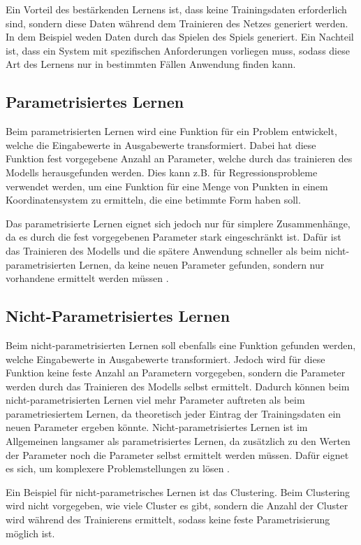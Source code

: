 Ein Vorteil des bestärkenden Lernens ist, dass keine Trainingsdaten erforderlich sind, sondern diese Daten während dem Trainieren des Netzes generiert werden. In dem Beispiel weden Daten durch das Spielen des Spiels generiert. Ein Nachteil ist, dass ein System mit spezifischen Anforderungen vorliegen muss, sodass diese Art des Lernens nur in bestimmten Fällen Anwendung finden kann.

\subsection{Parametrisiertes Lernen}
\label{parametrisiertesLernen}
Beim parametrisierten Lernen wird eine Funktion für ein Problem entwickelt, welche die Eingabewerte in Ausgabewerte transformiert. Dabei hat diese Funktion fest vorgegebene Anzahl an Parameter, welche durch das trainieren des Modells herausgefunden werden. Dies kann z.B. für Regressionsprobleme verwendet werden, um eine Funktion für eine Menge von Punkten in einem Koordinatensystem zu ermitteln, die eine betimmte Form haben soll.

Das parametrisierte Lernen eignet sich jedoch nur für simplere Zusammenhänge, da es durch die fest vorgegebenen Parameter stark eingeschränkt ist. Dafür ist das Trainieren des Modells und die spätere Anwendung schneller als beim nicht-parametrisierten Lernen, da keine neuen Parameter gefunden, sondern nur vorhandene ermittelt werden müssen \cite[vgl.][]{paraNichtPara}.

\subsection{Nicht-Parametrisiertes Lernen}
\label{nichtParametrisiertesLernen}
Beim nicht-parametrisierten Lernen soll ebenfalls eine Funktion gefunden werden, welche Eingabewerte in Ausgabewerte transformiert. Jedoch wird für diese Funktion keine feste Anzahl an Parametern vorgegeben, sondern die Parameter werden durch das Trainieren des Modells selbst ermittelt. Dadurch können beim nicht-parametrisierten Lernen viel mehr Parameter auftreten als beim parametriesiertem Lernen, da theoretisch jeder Eintrag der Trainingsdaten ein neuen Parameter ergeben könnte. Nicht-parametrisiertes Lernen ist im Allgemeinen langsamer als parametrisiertes Lernen, da zusätzlich zu den Werten der Parameter noch die Parameter selbst ermittelt werden müssen. Dafür eignet es sich, um komplexere Problemstellungen zu lösen \cite[vgl.][]{paraNichtPara}.

Ein Beispiel für nicht-parametrisches Lernen ist das Clustering. Beim Clustering wird nicht vorgegeben, wie viele Cluster es gibt, sondern die Anzahl der Cluster wird während des Trainierens ermittelt, sodass keine feste Parametrisierung möglich ist.

